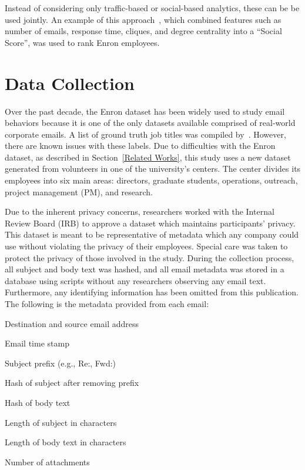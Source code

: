 \documentclass[10pt,twocolumn,conference]{IEEEtran}
\begin{document}
Instead of considering only traffic-based or social-based analytics, these can be be used jointly.  An example of this approach~\cite{rowe_automated_2007}, which combined features such as number of emails, response time, cliques, and degree centrality into a ``Social Score'', was used to rank Enron employees.  

\section{Data Collection} \label{Data Collection}

Over the past decade, the Enron dataset has been widely used to study email behaviors because it is one of the only datasets available comprised of real-world corporate emails.  A list of ground truth job titles was compiled by~\cite{shetty_status_2004}.  However, there are known issues with these labels.  Due to difficulties with the Enron dataset, as described in Section~\ref{Related Works}, this study uses a new dataset generated from volunteers in one of the university's centers.  The center divides its employees into six main areas: directors, graduate students, operations, outreach, project management (PM), and research.

Due to the inherent privacy concerns, researchers worked with the Internal Review Board (IRB) to approve a dataset which maintains participants' privacy.  This dataset is meant to be representative of metadata which any company could use without violating the privacy of their employees.  Special care was taken to protect the privacy of those involved in the study.  During the collection process, all subject and body text was hashed, and all email metadata was stored in a database using scripts without any researchers observing any email text. Furthermore, any identifying information has been omitted from this publication.
The following is the metadata provided from each email:
\begin{compactitem}
\item Destination and source email address
\item Email time stamp
\item Subject prefix (e.g., Re:, Fwd:)
\item Hash of subject after removing prefix
\item Hash of body text
\item Length of subject in characters
\item Length of body text in characters
\item Number of attachments
\end{compactitem}
\end{document}
